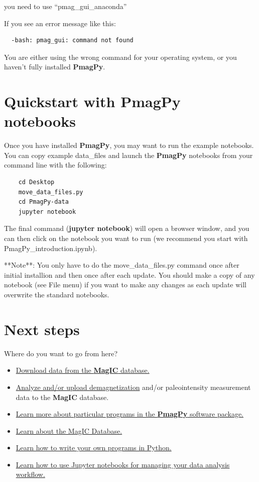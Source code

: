 \documentclass[11pt]{book}
\begin{document}
{you need to use ``pmag\_gui\_anaconda''

If you see an error message like this:

\begin{verbatim}
  -bash: pmag_gui: command not found
\end{verbatim}

You are either using the wrong command for your operating system, or you haven't fully installed {\bf PmagPy}.



\section{Quickstart with PmagPy notebooks}

Once you have installed {\bf PmagPy}, you may want to run the example notebooks.  You can copy example data\_files and launch the {\bf PmagPy} notebooks from your command line with the following:

\begin{verbatim}
    cd Desktop
    move_data_files.py
    cd PmagPy-data
    jupyter notebook
\end{verbatim}

The final command ({\bf jupyter notebook}) will open a browser window, and you can then click on the notebook you want to run (we recommend you start with PmagPy\_introduction.ipynb).

**Note**: You only have to do the move\_data\_files.py command once after initial installion and then once after each update.   You should make a copy of any notebook (see File menu) if you want to make any changes as each update will overwrite the standard notebooks.

\section{Next steps}

Where do you want to go from here?

\begin{itemize}
\item \href{#magic_download}{Download data from the {\bf MagIC} database.}
\item \href{#pmag_gui.py}{Analyze and/or upload demagnetization} and/or paleointensity measurement data to the {\bf MagIC} database.
\item \href{#PmagPy}{Learn more about particular programs in the {\bf PmagPy} software package.}
\item \href{#MagICDatabase}{Learn about the MagIC Database.}
\item \href{#Python}{Learn how to write your own programs in Python.}
\item \href{#Notebooks}{Learn how to use Jupyter notebooks for managing your data analysis workflow.}
\end{itemize}



}
\end{document}
